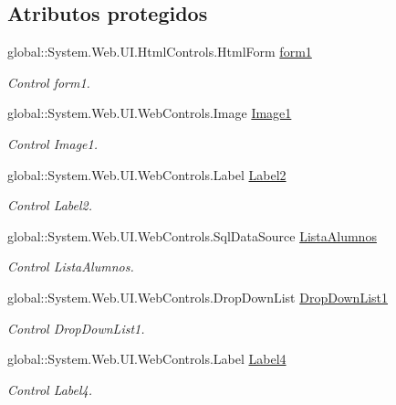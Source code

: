 \subsection*{Atributos protegidos}
\begin{DoxyCompactItemize}
\item 
global\+::\+System.\+Web.\+U\+I.\+Html\+Controls.\+Html\+Form \mbox{\hyperlink{classInicio_1_1Profesor_1_1Estadisticas_a1bdfaf6ebbcf378fff4819745a873b25}{form1}}
\begin{DoxyCompactList}\small\item\em Control form1. \end{DoxyCompactList}\item 
global\+::\+System.\+Web.\+U\+I.\+Web\+Controls.\+Image \mbox{\hyperlink{classInicio_1_1Profesor_1_1Estadisticas_a6193bfaaffbaa9eeec1a7e4e8387f077}{Image1}}
\begin{DoxyCompactList}\small\item\em Control Image1. \end{DoxyCompactList}\item 
global\+::\+System.\+Web.\+U\+I.\+Web\+Controls.\+Label \mbox{\hyperlink{classInicio_1_1Profesor_1_1Estadisticas_a12c6327350b856ff25585c2b1f00dfe7}{Label2}}
\begin{DoxyCompactList}\small\item\em Control Label2. \end{DoxyCompactList}\item 
global\+::\+System.\+Web.\+U\+I.\+Web\+Controls.\+Sql\+Data\+Source \mbox{\hyperlink{classInicio_1_1Profesor_1_1Estadisticas_a0bf55f4a182f6197fb6ed8f0d27b5912}{Lista\+Alumnos}}
\begin{DoxyCompactList}\small\item\em Control Lista\+Alumnos. \end{DoxyCompactList}\item 
global\+::\+System.\+Web.\+U\+I.\+Web\+Controls.\+Drop\+Down\+List \mbox{\hyperlink{classInicio_1_1Profesor_1_1Estadisticas_a1a8e94e528688fbde237649c62781102}{Drop\+Down\+List1}}
\begin{DoxyCompactList}\small\item\em Control Drop\+Down\+List1. \end{DoxyCompactList}\item 
global\+::\+System.\+Web.\+U\+I.\+Web\+Controls.\+Label \mbox{\hyperlink{classInicio_1_1Profesor_1_1Estadisticas_a70fd1d44295a1cd9446794a748af99e3}{Label4}}
\begin{DoxyCompactList}\small\item\em Control Label4. \end{DoxyCompactList}\item 

\end{DoxyCompactItemize}
